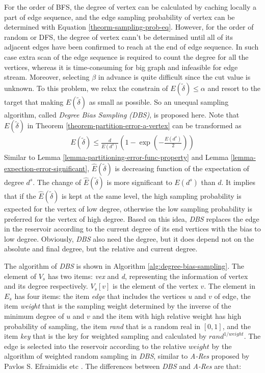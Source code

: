 \documentclass{sig-alternate-2013}
\begin{document}
For the order of BFS, the degree of vertex can be calculated by caching locally a part of edge sequence, and the edge sampling probability of vertex can be determined with Equation \eqref{theorm-sampling-prob-eq}.
However, for the order of random or DFS, the degree of vertex cann't be determined until all of its adjacent edges have been confirmed to reach at the end of edge sequence. In such case extra scan of the edge sequence is required to count the degree for all the vertices, whereas it is time-consuming for big graph and infeasible for edge stream.
Moreover, selecting $\beta$ in advance is quite difficult since the cut value is unknown.
To this problem, we relax the constrain of $E(\tilde\delta)\leq \alpha $ and resort to the target that making $E(\tilde\delta)$ as small as possible. So
an unequal sampling algorithm, called \textit{Degree Bias Sampling (DBS)}, is proposed here.
Note that $E(\tilde\delta)$ in Theorem \ref{theorem-partition-error-a-vertex} can be transformed as
\begin{eqnarray}\label{lemma-partitioning-error-func-of-expection-of-d}
{E(\tilde\delta)} \leq \frac{d}{E(d^s)} (1-\exp(-\frac{E(d^s)}{2}))
\end{eqnarray}
Similar to Lemma \ref{lemma-partitioning-error-func-property} and Lemma \ref{lemma-expection-error-significant}, $\hat{E}(\tilde\delta)$ is decreasing function of the expectation of degree $d^s$. The change of $\hat{E}(\tilde\delta)$ is more significant to $E(d^s)$ than $d$. It implies that if the $\hat{E}(\tilde\delta)$ is kept at the same level, the high sampling probability is expected for the vertex of low degree, otherwise the low sampling probability is preferred for the vertex of high degree. Based on this idea, \textit{DBS} replaces the edge in the reservoir according to the current degree of its end vertices with the bias to low degree. Obviously, \textit{DBS} also need the degree, but it does depend not on the absolute and final degree, but the relative and current degree.

The algorithm of \textit{DBS} is shown in Algorithm \ref{alg:degree-bias-sampling}. The element of $V_s$ has two items: \textit{vex} and \textit{d}, representing the information of vertex and its degree respectively. $V_s[v]$ is the element of the vertex $v$. The element in $E_s$ has four items: the item \textit{edge} that includes the vertices $u$ and $v$ of edge, the item \textit{weight} that is the sampling weight determined by the inverse of the minimum degree of $u$ and $v$ and the item with high relative weight has high probability of sampling,  the item \textit{rand} that is a random real in $[0,1]$, and the item \textit{key} that is the key for weighted sampling and calculated by ${rand}^{1/weight}$.   The edge is selected into the reservoir according to the relative $weight$ by the algorithm of weighted random sampling in \textit{DBS}, similar to \textit{A-Res} proposed by Pavlos S. Efraimidis etc \cite{Pavlos:weightedsampling}. The differences between \textit{DBS} and \textit{A-Res} are that:
\end{document}
